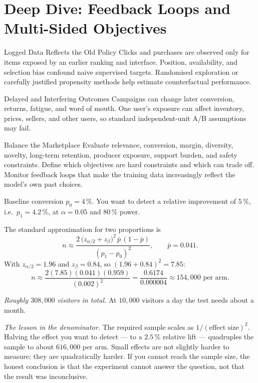\section{Deep Dive: Feedback Loops and Multi-Sided Objectives}
\begin{v3topic}{Logged Data Reflects the Old Policy}
Clicks and purchases are observed only for items exposed by an earlier ranking
and interface.
Position, availability, and selection bias confound naive supervised targets.
Randomised exploration or carefully justified propensity methods help estimate
counterfactual performance.

\end{v3topic}
\begin{v3topic}{Delayed and Interfering Outcomes}
Campaigns can change later conversion, returns, fatigue, and word of mouth.
One user's exposure can affect inventory, prices, sellers, and other users, so
standard independent-unit A/B assumptions may fail.

\end{v3topic}
\begin{v3topic}{Balance the Marketplace}
Evaluate relevance, conversion, margin, diversity, novelty, long-term retention,
producer exposure, support burden, and safety constraints.
Define which objectives are hard constraints and which can trade off.
Monitor feedback loops that make the training data increasingly reflect the
model's own past choices.
\end{v3topic}


\begin{workedexample}
Baseline conversion $p_0 = 4\,\%$. You want to detect a relative improvement of
$5\,\%$, i.e.\ $p_1 = 4.2\,\%$, at $\alpha = 0.05$ and $80\,\%$ power.

The standard approximation for two proportions is
\[
  n \approx \frac{2\,\bigl(z_{\alpha/2}+z_{\beta}\bigr)^2\,\bar p\,(1-\bar p)}
                 {(p_1-p_0)^2},
  \qquad \bar p = 0.041 .
\]
With $z_{\alpha/2} = 1.96$ and $z_\beta = 0.84$, so
$(1.96+0.84)^2 = 7.85$:
\[
  n \approx \frac{2(7.85)(0.041)(0.959)}{(0.002)^2}
    = \frac{0.6174}{0.000004}
    \approx 154{,}000 \text{ per arm.}
\]

\emph{Roughly $308{,}000$ visitors in total.} At $10{,}000$ visitors a day the
test needs about a month.

\emph{The lesson in the denominator.} The required sample scales as
$1/(\text{effect size})^2$. Halving the effect you want to detect --- to a
$2.5\,\%$ relative lift --- quadruples the sample to about $616{,}000$ per arm.
Small effects are not slightly harder to measure; they are quadratically
harder. If you cannot reach the sample size, the honest conclusion is that the
experiment cannot answer the question, not that the result was inconclusive.
\end{workedexample}

